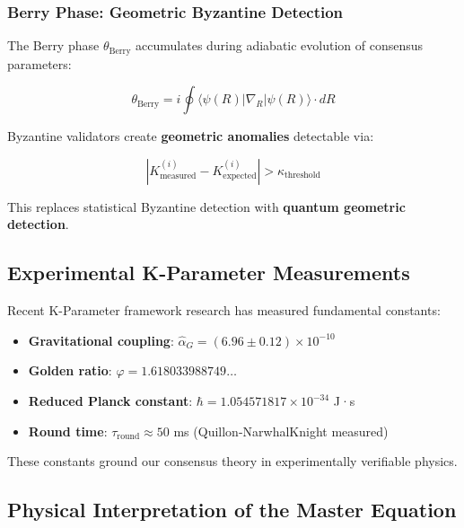 \documentclass[11pt,a4paper]{article}
\begin{document}
\subsubsection{Berry Phase: Geometric Byzantine Detection}

The Berry phase $\theta_{\text{Berry}}$ accumulates during adiabatic evolution of consensus parameters:

\begin{equation}
\theta_{\text{Berry}} = i\oint \langle \psi(R) | \nabla_R | \psi(R) \rangle \cdot dR
\end{equation}

Byzantine validators create \textbf{geometric anomalies} detectable via:

\begin{equation}
|K_{\text{measured}}^{(i)} - K_{\text{expected}}^{(i)}| > \kappa_{\text{threshold}}
\end{equation}

This replaces statistical Byzantine detection with \textbf{quantum geometric detection}.

\subsection{Experimental K-Parameter Measurements}

Recent K-Parameter framework research \cite{k-parameter-frontiers,k-parameter-entanglement} has measured fundamental constants:

\begin{tcolorbox}[colback=quantumgold!10,colframe=quantumgold,title=\textbf{Experimentally Measured Constants}]
\begin{itemize}
    \item \textbf{Gravitational coupling}: $\hat{\alpha}_G = (6.96 \pm 0.12) \times 10^{-10}$
    \item \textbf{Golden ratio}: $\varphi = 1.618033988749\ldots$
    \item \textbf{Reduced Planck constant}: $\hbar = 1.054571817 \times 10^{-34}$ J·s
    \item \textbf{Round time}: $\tau_{\text{round}} \approx 50$ ms (Quillon-NarwhalKnight measured)
\end{itemize}
\end{tcolorbox}

These constants ground our consensus theory in experimentally verifiable physics.

\subsection{Physical Interpretation of the Master Equation}
\end{document}
